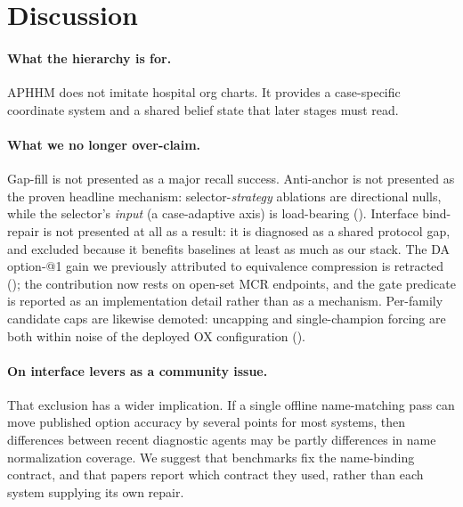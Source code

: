 \section{Discussion}
\label{sec:discussion}

\paragraph{What the hierarchy is for.}
APHHM does not imitate hospital org charts.
It provides a case-specific coordinate system and a shared belief state that later stages must read.

\paragraph{What we no longer over-claim.}
Gap-fill is not presented as a major recall success.
Anti-anchor is not presented as the proven headline mechanism: selector-\emph{strategy} ablations are directional nulls, while the selector's \emph{input} (a case-adaptive axis) is load-bearing ().
Interface bind-repair is not presented at all as a result: it is diagnosed as a shared protocol gap, and excluded because it benefits baselines at least as much as our stack.
The DA option-@1 gain we previously attributed to equivalence compression is retracted (); the contribution now rests on open-set MCR endpoints, and the gate predicate is reported as an implementation detail rather than as a mechanism.
Per-family candidate caps are likewise demoted: uncapping and single-champion forcing are both within noise of the deployed OX configuration ().

\paragraph{On interface levers as a community issue.}
That exclusion has a wider implication.
If a single offline name-matching pass can move published option accuracy by several points for most systems, then differences between recent diagnostic agents may be partly differences in name normalization coverage.
We suggest that benchmarks fix the name-binding contract, and that papers report which contract they used, rather than each system supplying its own repair.

